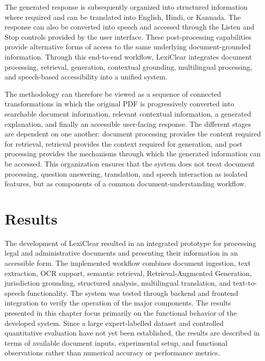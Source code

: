\documentclass[12pt,a4paper,oneside]{report}
\begin{document}
The generated response is subsequently organized into structured
information where required and can be translated into English, Hindi, or
Kannada. The response can also be converted into speech and accessed
through the Listen and Stop controls provided by the user interface. These
post-processing capabilities provide alternative forms of access to the
same underlying document-grounded information. Through this end-to-end
workflow, LexiClear integrates document processing, retrieval, generation,
contextual grounding, multilingual processing, and speech-based
accessibility into a unified system.

The methodology can therefore be viewed as a sequence of connected
transformations in which the original PDF is progressively converted into
searchable document information, relevant contextual information, a
generated explanation, and finally an accessible user-facing response. The
different stages are dependent on one another: document processing provides
the content required for retrieval, retrieval provides the context required
for generation, and post processing provides the mechanisms through which
the generated information can be accessed. This organization ensures that
the system does not treat document processing, question answering,
translation, and speech interaction as isolated features, but as components
of a common document-understanding workflow.

\chapter{Results}

The development of LexiClear resulted in an integrated prototype for processing legal and administrative documents and presenting their information in an accessible form. The implemented workflow combines document ingestion, text extraction, OCR support, semantic retrieval, Retrieval-Augmented Generation, jurisdiction grounding, structured analysis, multilingual translation, and text-to-speech functionality. The system was tested through backend and frontend integration to verify the operation of the major components. The results presented in this chapter focus primarily on the functional behavior of the developed system. Since a large expert-labelled dataset and controlled quantitative evaluation have not yet been established, the results are described in terms of available document inputs, experimental setup, and functional observations rather than numerical accuracy or performance metrics.
\end{document}
